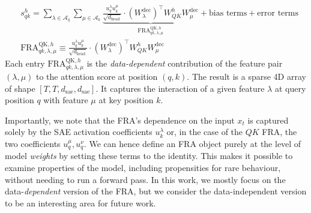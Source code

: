 \documentclass{article}
\theoremstyle{plain}
\theoremstyle{definition}
\theoremstyle{remark}
\newcommand{\WQK}{W_{QK}}
\newcommand{\dhead}{d_{\mathrm{head}}}
\newcommand{\dsae}{d_{\mathrm{sae}}}
\begin{document}
\begin{equation}
\begin{aligned}
    &s^h_{qk} = \sum_{\lambda \in \mathcal{A}_q} \sum_{\mu \in \mathcal{A}_k} \underbrace{\frac{u_q^\lambda u_k^\mu}{\sqrt{\dhead}} \cdot (W^{\mathrm{dec}}_\lambda)^\top \WQK^h W^{\mathrm{dec}}_\mu}_{\mathrm{FRA}^{\mathrm{QK},h}_{qk,\lambda,\mu}}+ \text{bias terms}+ \text{error terms}\\
    &\mathrm{FRA}^{\mathrm{QK},h}_{qk,\lambda,\mu}\equiv\frac{u_q^\lambda u_k^\mu}{\sqrt{\dhead}} \cdot (W^{\mathrm{dec}}_\lambda)^\top \WQK^h W^{\mathrm{dec}}_\mu
\end{aligned}
\label{eq:qk_fra}
\end{equation}
Each entry $\mathrm{FRA}^{\mathrm{QK},h}_{qk,\lambda,\mu}$ is the \emph{data-dependent} contribution of the feature pair $(\lambda, \mu)$ to the attention score at position $(q,k)$. The result is a sparse 4D array of shape $[T, T, \dsae, \dsae]$. It captures the interaction of a given feature $\lambda$ at query position $q$ with feature $\mu$ at key position $k$.

Importantly, we note that the FRA's dependence on the input $x_t$ is captured solely by the SAE activation coefficients $u^\lambda_k$ or, in the case of the $QK$ FRA, the two coefficients $u^\mu_q,u^\nu_q$. We can hence define an FRA object purely at the level of model \textit{weights} by setting these terms to the identity. This makes it possible to examine properties of the model, including propensities for rare behaviour, without needing to run a forward pass. In this work, we mostly focus on the data-\textit{dependent} version of the FRA, but we consider the data-independent version to be an interesting area for future work.



\end{document}
